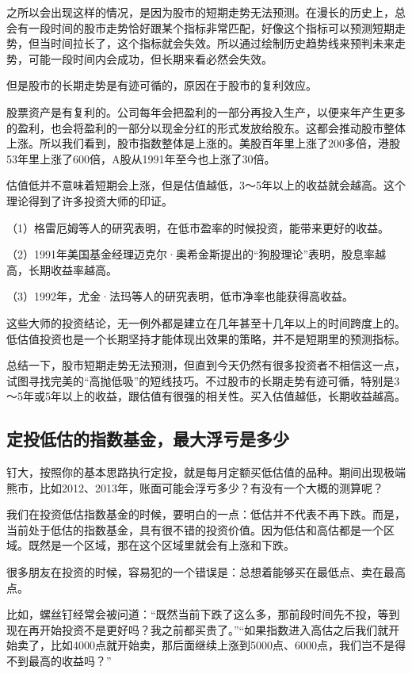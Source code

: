之所以会出现这样的情况，是因为股市的短期走势无法预测。在漫长的历史上，总会有一段时间的股市走势恰好跟某个指标非常匹配，好像这个指标可以预测短期走势，但当时间拉长了，这个指标就会失效。所以通过绘制历史趋势线来预判未来走势，可能一段时间内会成功，但长期来看必然会失效。

但是股市的长期走势是有迹可循的，原因在于股市的复利效应。

股票资产是有复利的。公司每年会把盈利的一部分再投入生产，以便来年产生更多的盈利，也会将盈利的一部分以现金分红的形式发放给股东。这都会推动股市整体上涨。所以我们看到，股市指数整体是上涨的。美股百年里上涨了200多倍，港股53年里上涨了600倍，A股从1991年至今也上涨了30倍。

估值低并不意味着短期会上涨，但是估值越低，3～5年以上的收益就会越高。这个理论得到了许多投资大师的印证。

（1）格雷厄姆等人的研究表明，在低市盈率的时候投资，能带来更好的收益。

（2）1991年美国基金经理迈克尔·奥希金斯提出的“狗股理论”表明，股息率越高，长期收益率越高。

（3）1992年，尤金·法玛等人的研究表明，低市净率也能获得高收益。

这些大师的投资结论，无一例外都是建立在几年甚至十几年以上的时间跨度上的。低估值投资也是一个长期坚持才能体现出效果的策略，并不是短期里的预测指标。

总结一下，股市短期走势无法预测，但直到今天仍然有很多投资者不相信这一点，试图寻找完美的“高抛低吸”的短线技巧。不过股市的长期走势有迹可循，特别是3～5年或5年以上的收益，跟估值有很强的相关性。买入估值越低，长期收益越高。

\subsection{定投低估的指数基金，最大浮亏是多少}
{\kaishu 钉大，按照你的基本思路执行定投，就是每月定额买低估值的品种。期间出现极端熊市，比如2012、2013年，账面可能会浮亏多少？有没有一个大概的测算呢？}

我们在投资低估指数基金的时候，要明白的一点：低估并不代表不再下跌。而是，当前处于低估的指数基金，具有很不错的投资价值。因为低估和高估都是一个区域。既然是一个区域，那在这个区域里就会有上涨和下跌。

很多朋友在投资的时候，容易犯的一个错误是：总想着能够买在最低点、卖在最高点。

比如，螺丝钉经常会被问道：“既然当前下跌了这么多，那前段时间先不投，等到现在再开始投资不是更好吗？我之前都买贵了。”“如果指数进入高估之后我们就开始卖了，比如4000点就开始卖，那后面继续上涨到5000点、6000点，我们岂不是得不到最高的收益吗？”

